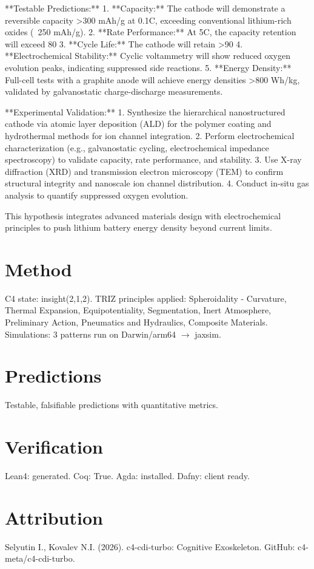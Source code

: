 \documentclass[12pt]{article}
\begin{document}
**Testable Predictions:**  
1. **Capacity:** The cathode will demonstrate a reversible capacity >300 mAh/g at 0.1C, exceeding conventional lithium-rich oxides (~250 mAh/g).  
2. **Rate Performance:** At 5C, the capacity retention will exceed 80%
3. **Cycle Life:** The cathode will retain >90%
4. **Electrochemical Stability:** Cyclic voltammetry will show reduced oxygen evolution peaks, indicating suppressed side reactions.  
5. **Energy Density:** Full-cell tests with a graphite anode will achieve energy densities >800 Wh/kg, validated by galvanostatic charge-discharge measurements.  

**Experimental Validation:**  
1. Synthesize the hierarchical nanostructured cathode via atomic layer deposition (ALD) for the polymer coating and hydrothermal methods for ion channel integration.  
2. Perform electrochemical characterization (e.g., galvanostatic cycling, electrochemical impedance spectroscopy) to validate capacity, rate performance, and stability.  
3. Use X-ray diffraction (XRD) and transmission electron microscopy (TEM) to confirm structural integrity and nanoscale ion channel distribution.  
4. Conduct in-situ gas analysis to quantify suppressed oxygen evolution.  

This hypothesis integrates advanced materials design with electrochemical principles to push lithium battery energy density beyond current limits.
\section{Method}
C4 state: insight(2,1,2). TRIZ principles applied: Spheroidality - Curvature, Thermal Expansion, Equipotentiality, Segmentation, Inert Atmosphere, Preliminary Action, Pneumatics and Hydraulics, Composite Materials.
Simulations: 3 patterns run on Darwin/arm64 $\rightarrow$ jaxsim.
\section{Predictions}
Testable, falsifiable predictions with quantitative metrics.
\section{Verification}
Lean4: generated. Coq: True. Agda: installed. Dafny: client ready.
\section*{Attribution}
Selyutin I., Kovalev N.I. (2026). c4-cdi-turbo: Cognitive Exoskeleton. GitHub: c4-meta/c4-cdi-turbo.
\end{document}
